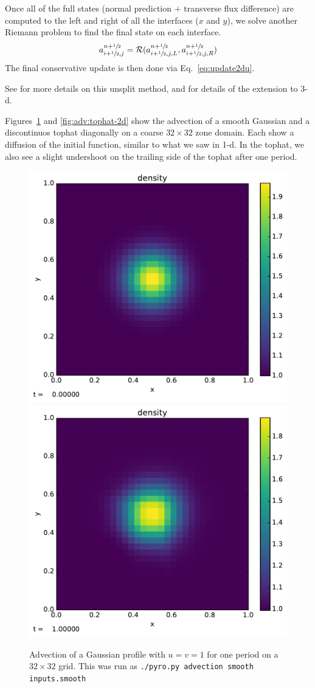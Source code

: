 Once all of the full states (normal prediction $+$ transverse flux
difference) are computed to the left and right of all the interfaces
($x$ and $y$), we solve another Riemann problem to find the final 
state on each interface.
\begin{equation}
a_{i+{\sfrac{1}{2}},j}^{n+{\sfrac{1}{2}}} = \mathcal{R}(a_{i+{\sfrac{1}{2}},j,L}^{n+{\sfrac{1}{2}}},
                                  a_{i+{\sfrac{1}{2}},j,R}^{n+{\sfrac{1}{2}}}) \\
\end{equation}
The final conservative update is then done via Eq.~\ref{eq:update2du}.

See \cite{colella:1990} for more details on this unsplit method, 
and \cite{saltzman:1994} for details of the extension to 3-d.

Figures~\ref{fig:adv:gaussian-2d} and \ref{fig:adv:tophat-2d} show the
advection of a smooth Gaussian and a discontinuos tophat diagonally on
a coarse $32\times 32$ zone domain.  Each show a diffusion of the
initial function, similar to what we saw in 1-d.  In the tophat, we
also see a slight undershoot on the trailing side of the tophat after
one period.




\begin{figure}
\centering
\includegraphics[width=0.48\linewidth]{smooth_init}\hspace{1em}
\includegraphics[width=0.48\linewidth]{smooth_final}
\caption{\label{fig:adv:gaussian-2d} Advection of a Gaussian profile
  with $u = v = 1$ for one period on a $32\times 32$ grid.  This
was run as {\tt ./pyro.py advection smooth inputs.smooth}}
\end{figure}

